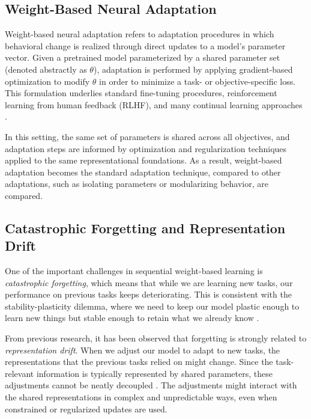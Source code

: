 \documentclass{article}
\begin{document}
	\subsection{Weight-Based Neural Adaptation}
	\label{sec:weight_based_adaptation}
	
	Weight-based neural adaptation refers to adaptation procedures in which behavioral change is realized through direct updates to a model’s parameter vector. Given a pretrained model parameterized by a shared parameter set (denoted abstractly as $\theta$), adaptation is performed by applying gradient-based optimization to modify $\theta$ in order to minimize a task- or objective-specific loss. This formulation underlies standard fine-tuning procedures, reinforcement learning from human feedback (RLHF), and many continual learning approaches \cite{kirkpatrick2017ewc,delange2021continual}.
	
	In this setting, the same set of parameters is shared across all objectives, and adaptation steps are informed by optimization and regularization techniques applied to the same representational foundations. As a result, weight-based adaptation becomes the standard adaptation technique, compared to other adaptations, such as isolating parameters or modularizing behavior, are compared.
	
	\subsection{Catastrophic Forgetting and Representation Drift}
	\label{sec:forgetting_drift}
	
	One of the important challenges in sequential weight-based learning is \emph{catastrophic forgetting}, which means that while we are learning new tasks, our performance on previous tasks keeps deteriorating. This is consistent with the stability-plasticity dilemma, where we need to keep our model plastic enough to learn new things but stable enough to retain what we already know \cite{kirkpatrick2017ewc,delange2021continual}.
	
	From previous research, it has been observed that forgetting is strongly related to \emph{representation drift}. When we adjust our model to adapt to new tasks, the representations that the previous tasks relied on might change. Since the task-relevant information is typically represented by shared parameters, these adjustments cannot be neatly decoupled \cite{kaushik2021rmn}. The adjustments might interact with the shared representations in complex and unpredictable ways, even when constrained or regularized updates are used.
	
\end{document}
